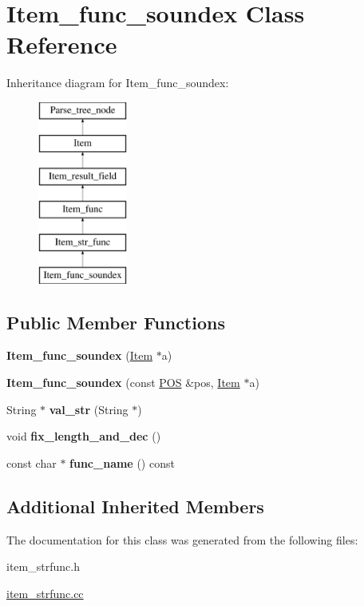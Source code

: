 \hypertarget{classItem__func__soundex}{}\section{Item\+\_\+func\+\_\+soundex Class Reference}
\label{classItem__func__soundex}
Inheritance diagram for Item\+\_\+func\+\_\+soundex\+:\begin{figure}[H]
\begin{center}
\leavevmode
\includegraphics[height=6.000000cm]{classItem__func__soundex}
\end{center}
\end{figure}
\subsection*{Public Member Functions}
\begin{DoxyCompactItemize}
\item 
\mbox{\label{classItem__func__soundex_a9362a541b4c871d049f91b7a45bf5c08}} 
{\bfseries Item\+\_\+func\+\_\+soundex} (\mbox{\hyperlink{classItem}{Item}} $\ast$a)
\item 
\mbox{\label{classItem__func__soundex_a5cccd9781dffe637104f44e71429ad3a}} 
{\bfseries Item\+\_\+func\+\_\+soundex} (const \mbox{\hyperlink{structYYLTYPE}{P\+OS}} \&pos, \mbox{\hyperlink{classItem}{Item}} $\ast$a)
\item 
\mbox{\label{classItem__func__soundex_a6bb02a65e8aced06e24fae72f62a0c80}} 
String $\ast$ {\bfseries val\+\_\+str} (String $\ast$)
\item 
\mbox{\label{classItem__func__soundex_a39af9e4c717a51cc084f4703c5955558}} 
void {\bfseries fix\+\_\+length\+\_\+and\+\_\+dec} ()
\item 
\mbox{\label{classItem__func__soundex_aee28db721208d3c9e48866944f4104a3}} 
const char $\ast$ {\bfseries func\+\_\+name} () const
\end{DoxyCompactItemize}
\subsection*{Additional Inherited Members}


The documentation for this class was generated from the following files\+:\begin{DoxyCompactItemize}
\item 
item\+\_\+strfunc.\+h\item 
\mbox{\hyperlink{item__strfunc_8cc}{item\+\_\+strfunc.\+cc}}\end{DoxyCompactItemize}
